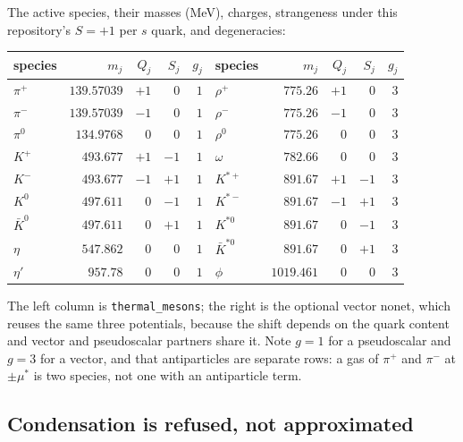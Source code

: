 \documentclass[aps,prc,onecolumn,superscriptaddress,nofootinbib,10pt]{revtex4-2}
\begin{document}
The active species, their masses (MeV), charges, strangeness under this
repository's $S = +1$ per $s$ quark, and degeneracies:
%
\begin{center}
\begin{tabular}{lrrrr@{\qquad}lrrrr}
\toprule
species & $m_j$ & $Q_j$ & $S_j$ & $g_j$ &
species & $m_j$ & $Q_j$ & $S_j$ & $g_j$ \\
\midrule
$\pi^+$    & $139.57039$ & $+1$ & $0$  & $1$ &
$\rho^+$   & $775.26$    & $+1$ & $0$  & $3$ \\
$\pi^-$    & $139.57039$ & $-1$ & $0$  & $1$ &
$\rho^-$   & $775.26$    & $-1$ & $0$  & $3$ \\
$\pi^0$    & $134.9768$  & $0$  & $0$  & $1$ &
$\rho^0$   & $775.26$    & $0$  & $0$  & $3$ \\
$K^+$      & $493.677$   & $+1$ & $-1$ & $1$ &
$\omega$   & $782.66$    & $0$  & $0$  & $3$ \\
$K^-$      & $493.677$   & $-1$ & $+1$ & $1$ &
$K^{*+}$   & $891.67$    & $+1$ & $-1$ & $3$ \\
$K^0$      & $497.611$   & $0$  & $-1$ & $1$ &
$K^{*-}$   & $891.67$    & $-1$ & $+1$ & $3$ \\
$\bar K^0$ & $497.611$   & $0$  & $+1$ & $1$ &
$K^{*0}$   & $891.67$    & $0$  & $-1$ & $3$ \\
$\eta$     & $547.862$   & $0$  & $0$  & $1$ &
$\bar K^{*0}$ & $891.67$ & $0$  & $+1$ & $3$ \\
$\eta'$    & $957.78$    & $0$  & $0$  & $1$ &
$\phi$     & $1019.461$  & $0$  & $0$  & $3$ \\
\bottomrule
\end{tabular}
\end{center}
%
The left column is \texttt{thermal\_mesons}; the right is the optional vector
nonet, which reuses the same three potentials, because the shift depends on
the quark content and vector and pseudoscalar partners share it. Note
$g = 1$ for a pseudoscalar and $g = 3$ for a vector, and that antiparticles
are separate rows: a gas of $\pi^+$ and $\pi^-$ at $\pm\mu^*$ is two species,
not one with an antiparticle term.

\subsection{Condensation is refused, not approximated}
\end{document}
